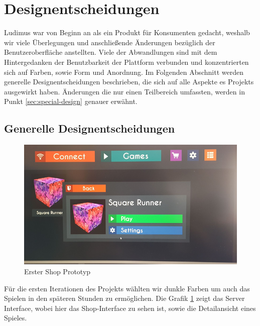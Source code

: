 \section{Designentscheidungen}
Ludimus war von Beginn an als ein Produkt für Konsumenten gedacht, weshalb wir viele Überlegungen und anschließende Änderungen bezüglich der Benutzeroberfläche anstellten. Viele der Abwandlungen sind mit dem Hintergedanken der Benutzbarkeit der Plattform verbunden und konzentrierten sich auf Farben, sowie Form und Anordnung. Im Folgenden Abschnitt werden generelle Designentscheidungen beschrieben, die sich auf alle Aspekte es Projekts ausgewirkt haben. Änderungen die nur einen Teilbereich umfassten, werden in Punkt \ref{sec:special-design} genauer erwähnt.
\subsection{Generelle Designentscheidungen}
\begin{center}
    \begin{figure}
        \includegraphics[scale=0.7]{images/design01.png} 
        \caption{Erster Shop Prototyp}
        \label{img:design01}
    \end{figure}
\end{center}
Für die ersten Iterationen des Projekts wählten wir dunkle Farben um auch das Spielen in den späteren Stunden zu ermöglichen. Die Grafik \ref{img:design01} zeigt das Server Interface, wobei hier das Shop-Interface zu sehen ist, sowie die Detailansicht eines Spieles. 
\newline
